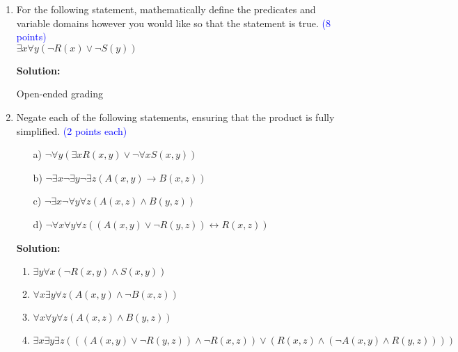 \documentclass{article}
\newcommand{\pt}[1]{\textcolor{blue}{(#1 points)}}
\newcommand{\pte}[1]{\textcolor{blue}{(#1 points each)}}
\newenvironment{solution}
{
\par
\color{blue}
\textbf{Solution:}
}
{
\par
}
\begin{document}
\begin{enumerate}
    \vspace{2mm}
    \begin{solution}
    \begin{enumerate}
        \item $\forall x \exists y (O(x,y))$
        \item $\exists x \forall y (C(x) \land O(x,y))$
        \item $\forall x \forall y ((C(x) \land F(y)) \rightarrow \neg O(x,y)))$
        \item $\forall x \forall y (O(x,y) \rightarrow (C(x) \lor F(x))))$
    \end{enumerate}
    \end{solution}
    
    \item For the following statement, mathematically define the predicates and variable domains however you would like so that the statement is true. \pt 8 \\

    $\exists x \forall y (\neg R(x) \lor \neg S(y))$
    
    \vspace{2mm}
    \begin{solution}
    Open-ended grading 
    \end{solution}
    
    \item Negate each of the following statements, ensuring that the product is fully simplified. \pte 2
    
    \begin{enumerate}
        \item[a)] $\neg  \forall y (\exists x R(x,y) \lor \neg \forall x S(x,y))$
        \item[b)] $\neg  \exists x \neg \exists y \neg \exists z (A(x,y) \rightarrow B(x,z))$ 
        \item[c)] $\neg  \exists x \neg \forall y \forall z (A(x,z) \land B(y,z))$
        \item[d)] $\neg \forall x \forall y \forall z ((A(x,y) \lor \neg R(y,z)) \longleftrightarrow R(x,z))$
    \end{enumerate}
    
    \vspace{2mm}
    \begin{solution}
    \begin{enumerate}
        \item $\exists y \forall x (\neg R(x,y) \land S(x,y))$
        \item $\forall x \exists y \forall z (A(x,y) \land \neg B(x,z))$
        \item $\forall x \forall y \forall z (A(x,z) \land B(y,z))$
        \item $\exists x \exists y \exists z (((A(x,y) \lor \neg R(y,z)) \land \neg R(x,z)) \lor (R(x,z) \land (\neg A(x,y) \land R(y,z))))$
    \end{enumerate}
    \end{solution}
    

\end{enumerate}
\end{document}
